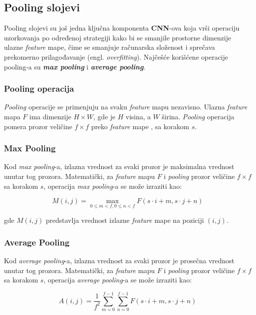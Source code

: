 \documentclass[12pt]{article}
\begin{document}
    \subsection*{Pooling slojevi}
   Pooling slojevi su još jedna ključna komponenta \textbf{CNN}-ova koja vrši operaciju uzorkovanja po određenoj strategiji kako bi 
   se smanjile prostorne dimenzije ulazne \textit{feature} mape, čime se smanjuje 
   računarska složenost i sprečava prekomerno prilagođavanje (engl. \textit{overfitting}). 
   Najčešće korišćene operacije pooling-a su \textbf{\textit{max pooling}} i \textbf{\textit{average pooling}}.
   \subsubsection*{Pooling operacija}
   \textit{Pooling} operacije se primenjuju na svaku \textit{feature} mapu nezavisno. 
   Ulazna \textit{feature} mapa \( F \) ima dimenzije \( H \times W \), gde je \( H \) visina, 
   a \( W \) širina. \textit{Pooling} operacija pomera prozor veličine \( f \times f \) preko \textit{feature} mape
   , sa korakom \( s \).

   \subsubsection*{Max Pooling}

   Kod \textit{max pooling}-a, izlazna vrednost za svaki prozor je maksimalna vrednost 
   unutar tog prozora. Matematički, za \textit{feature} mapu \( F \) i \textit{pooling} prozor 
   veličine \( f \times f \) sa korakom \( s \), 
   operacija \textit{max pooling}-a se može izraziti kao:

   \[
   M(i, j) = \max_{0 \leq m < f, 0 \leq n < f} F(s \cdot i + m, s \cdot j + n)
   \]

   gde \( M(i, j) \) predstavlja vrednost izlazne \textit{feature} mape na poziciji \((i, j)\).

   \subsubsection*{Average Pooling}

   Kod \textit{average pooling}-a, izlazna vrednost za svaki prozor je prosečna vrednost unutar tog 
   prozora. Matematički, za \textit{feature} mapu \( F \) i \textit{pooling} prozor veličine 
   \( f \times f \) sa korakom \( s \), 
   operacija \textit{average pooling}-a se može izraziti kao:

   \[
   A(i, j) = \frac{1}{f^2} \sum_{m=0}^{f-1} \sum_{n=0}^{f-1} F(s \cdot i + m, s \cdot j + n)
   \]
\end{document}
